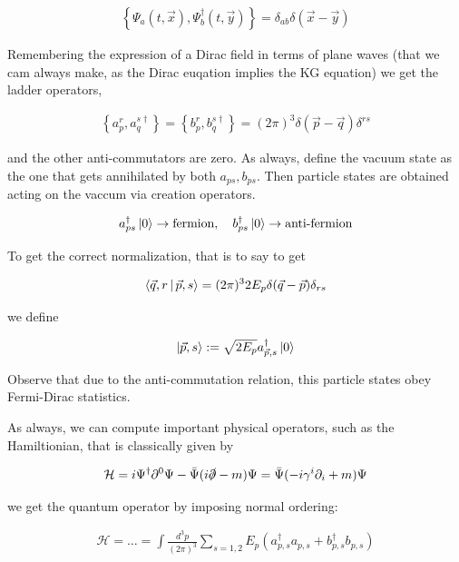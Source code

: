 \documentclass{report}
\begin{document}
\begin{align}
    \left\{ \Psi_a (t, \vec{x}), \Psi^\dagger_b(t, \vec{y})\right\} = \delta_{ab}\delta(\vec{x}-\vec{y})
\end{align}

Remembering the expression of a Dirac field in terms of plane waves (that we cam always make, as the Dirac euqation implies the KG equation) we get the ladder operators, 

\begin{align}
    \left\{a_p^r, a_q^{s\dagger} \right\} = \left\{b_p^r, b_q^{s\dagger} \right\} = (2\pi)^3\delta(\vec{p}-\vec{q})\delta^{rs}
\end{align}

and the other anti-commutators are zero. As always, define the vacuum state as the one that gets annihilated by both \(a_{ps}, b_{ps}\). Then particle states are obtained acting on the vaccum via creation operators. 

\begin{align}
    a^\dagger_{ps}\ket{0} \rightarrow \text{fermion}, \quad b^\dagger_{ps}\ket{0} \rightarrow \text{anti-fermion}
\end{align}

To get the correct normalization, that is to say to get 


\begin{align}
    \Braket{\vec{q}, r | \vec{p}, s} = (2\pi)^32E_p \delta(\vec{q}-\vec{p})\delta_{rs}
\end{align}

we define 

\begin{align}
    \ket{\vec{p}, s} := \sqrt{2E_p}a^\dagger_{\vec{p}, s}\ket{0}
\end{align}

Observe that due to the anti-commutation relation, this particle states obey Fermi-Dirac statistics. 

As always, we can compute important physical operators, such as the Hamiltionian, that is classically given by 

\begin{align}
    \mathcal{H} = i\Psi^\dagger \partial^0 \Psi - \bar{\Psi}(i\slashed{\partial}-m)\Psi = \bar{\Psi}(-i\gamma^i\partial_i +m)\Psi
\end{align}

we get the quantum operator by imposing normal ordering: 

\begin{align}
    \mathcal{H} = \ldots = \int \frac{d^3p}{(2\pi)^3}\sum_{s = 1,2}E_p (a^\dagger_{p, s}a_{p, s} + b^\dagger_{p, s}b_{p, s})
\end{align}
\end{document}
